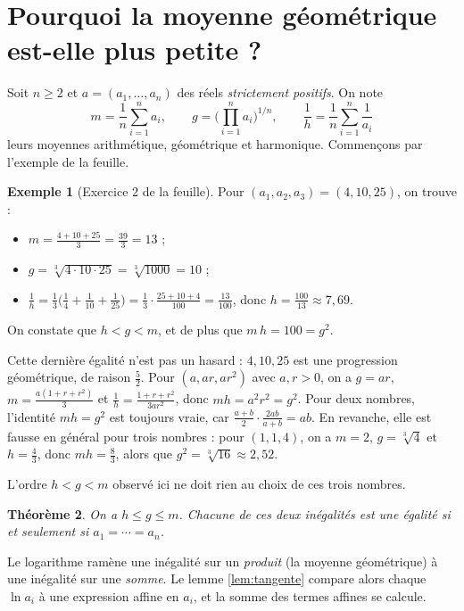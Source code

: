 \documentclass[11pt,a4paper]{article}
\theoremstyle{plain}
\newtheorem{theoreme}{Théorème}[section]
\theoremstyle{definition}
\newtheorem{exemple}[theoreme]{Exemple}
\theoremstyle{remark}
\begin{document}
\section{Pourquoi la moyenne géométrique est-elle plus petite ?}

Soit $n\geq2$ et $a=(a_1,\dots,a_n)$ des réels \emph{strictement positifs}. On note
\[
  m=\frac1n\sum_{i=1}^na_i,\qquad
  g=\Big(\prod_{i=1}^na_i\Big)^{1/n},\qquad
  \frac1h=\frac1n\sum_{i=1}^n\frac1{a_i}
\]
leurs moyennes arithmétique, géométrique et harmonique. Commençons par l'exemple de la feuille.

\begin{exemple}[Exercice 2 de la feuille]\label{ex:4-10-25}
Pour $(a_1,a_2,a_3)=(4,10,25)$, on trouve :
\begin{itemize}[nosep]
\item $m=\frac{4+10+25}3=\frac{39}3=13$ ;
\item $g=\sqrt[3]{4\cdot10\cdot25}=\sqrt[3]{1000}=10$ ;
\item $\frac1h=\frac13\big(\frac14+\frac1{10}+\frac1{25}\big)=\frac13\cdot\frac{25+10+4}{100}=\frac{13}{100}$, donc $h=\frac{100}{13}\approx7{,}69$.
\end{itemize}
On constate que $h<g<m$, et de plus que $m\,h=100=g^2$.

Cette dernière égalité n'est pas un hasard : $4,10,25$ est une progression géométrique, de raison $\frac52$. Pour $(a,ar,ar^2)$ avec $a,r>0$, on a $g=ar$, $m=\frac{a(1+r+r^2)}3$ et $\frac1h=\frac{1+r+r^2}{3ar^2}$, donc $mh=a^2r^2=g^2$. Pour deux nombres, l'identité $mh=g^2$ est toujours vraie, car $\frac{a+b}2\cdot\frac{2ab}{a+b}=ab$. En revanche, elle est fausse en général pour trois nombres : pour $(1,1,4)$, on a $m=2$, $g=\sqrt[3]4$ et $h=\frac43$, donc $mh=\frac83$, alors que $g^2=\sqrt[3]{16}\approx2{,}52$.
\end{exemple}

L'ordre $h<g<m$ observé ici ne doit rien au choix de ces trois nombres.

\begin{theoreme}\label{thm:hgm}
On a $h\leq g\leq m$. Chacune de ces deux inégalités est une égalité si et seulement si $a_1=\cdots=a_n$.
\end{theoreme}

Le logarithme ramène une inégalité sur un \emph{produit} (la moyenne géométrique) à une inégalité sur une \emph{somme}. Le lemme \ref{lem:tangente} compare alors chaque $\ln a_i$ à une expression affine en $a_i$, et la somme des termes affines se calcule.
\end{document}
